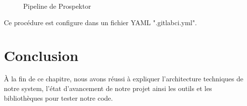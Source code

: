\begin{figure}[H]
	\caption{\label{fig:my-label} Pipeline de Prospektor}
\end{figure}

Ce proc\'edure est configure dans un fichier YAML ".gitlabci.yml".

\section{Conclusion}

\`A la fin de ce chapitre, nous avons r\'eussi \`a expliquer l'architecture techniques de notre system, l'\'etat d'avancement de notre projet ainsi les outils et les biblioth\`eques pour tester notre code.



